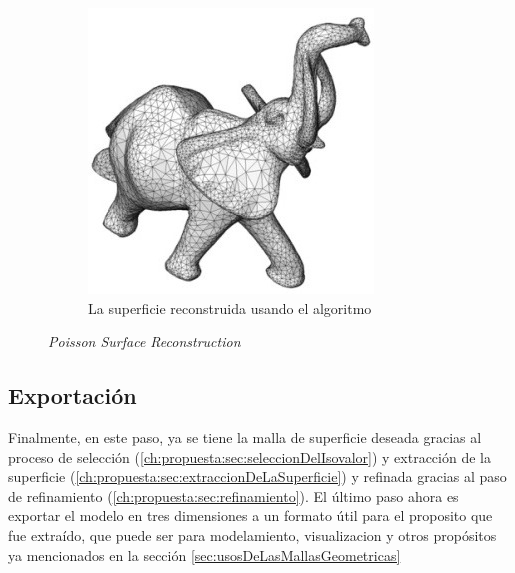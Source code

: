 \begin{figure}[h]
\begin{subfigure}[b]{0.45\textwidth}
		\includegraphics[width=\textwidth]{images/flujo/refinamiento_1_1.jpg}
		\caption{La superficie reconstruida usando el algoritmo}
		\label{f:flujoDeTrabajo:refinamiento_1_1}
	\end{subfigure}

	\caption{\emph{Poisson Surface Reconstruction}}
	\label{c:flujo:poissonSurfaceReconstruction}

\end{figure}


\subsection{Exportación}
\label{ch:propuesta:sec:exportacion}

Finalmente, en este paso, ya se tiene la malla de superficie deseada gracias al proceso de selección (\ref{ch:propuesta:sec:seleccionDelIsovalor}) y extracción de la superficie (\ref{ch:propuesta:sec:extraccionDeLaSuperficie}) y refinada gracias al paso de refinamiento (\ref{ch:propuesta:sec:refinamiento}). El último paso ahora es exportar el modelo en tres dimensiones a un formato útil para el proposito que fue extraído, que puede ser para modelamiento, visualizacion y otros propósitos ya mencionados en la sección \ref{sec:usosDeLasMallasGeometricas}
